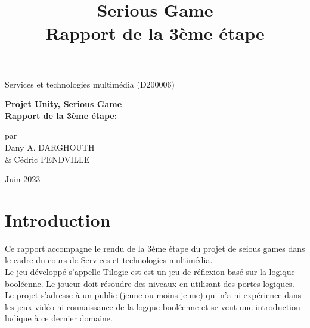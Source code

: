\documentclass{article}
\title{Serious Game\\Rapport de la 3ème étape}
\author{}
\date{}
\begin{document}
\begin{titlepage}
	\begin{center}

		\vspace*{2cm}
		
		{\Large Services et technologies multimédia (D200006)} %
		
		\vspace{5cm}
		{\huge\textbf{Projet Unity, Serious Game\\Rapport de la 3ème étape:\\ }}
		
		\vspace{4cm}
		{par\\\large Dany A. DARGHOUTH \\\& Cédric PENDVILLE}
		\vfill
		
		Juin 2023
		
		
		\end{center}
\end{titlepage}

\maketitle
\tableofcontents
\newpage

\section{Introduction}
Ce rapport accompagne le rendu de la 3ème étape du projet de seious games dans le cadre du cours de Services et technologies multimédia.\\

Le jeu développé s'appelle Tilogic est est un jeu de réflexion basé sur la logique booléenne. Le joueur doit résoudre des niveaux en utilisant des portes logiques. Le projet s'adresse à un public (jeune ou moins jeune) qui n'a ni expérience dans les jeux vidéo ni connaissance de la logque booléenne et se veut une introduction ludique à ce dernier domaine.\\
\end{document}
